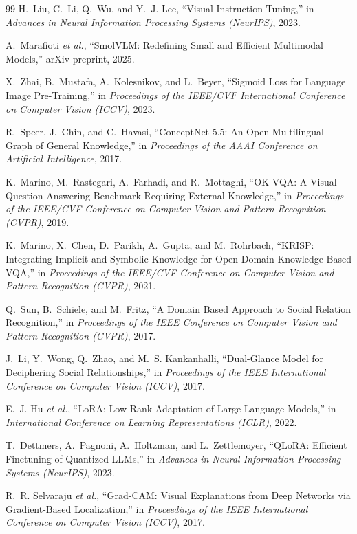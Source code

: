 \documentclass[12pt,a4paper,oneside]{report}
\begin{document}
\begin{thebibliography}{99}
H.~Liu, C.~Li, Q.~Wu, and Y.~J. Lee, ``Visual Instruction Tuning,'' in
\emph{Advances in Neural Information Processing Systems (NeurIPS)}, 2023.

A.~Marafioti \emph{et al.}, ``SmolVLM: Redefining Small and Efficient
Multimodal Models,'' arXiv preprint, 2025.

X.~Zhai, B.~Mustafa, A.~Kolesnikov, and L.~Beyer, ``Sigmoid Loss for Language
Image Pre-Training,'' in \emph{Proceedings of the IEEE/CVF International
Conference on Computer Vision (ICCV)}, 2023.

R.~Speer, J.~Chin, and C.~Havasi, ``ConceptNet 5.5: An Open Multilingual Graph
of General Knowledge,'' in \emph{Proceedings of the AAAI Conference on
Artificial Intelligence}, 2017.

K.~Marino, M.~Rastegari, A.~Farhadi, and R.~Mottaghi, ``OK-VQA: A Visual
Question Answering Benchmark Requiring External Knowledge,'' in
\emph{Proceedings of the IEEE/CVF Conference on Computer Vision and Pattern
Recognition (CVPR)}, 2019.

K.~Marino, X.~Chen, D.~Parikh, A.~Gupta, and M.~Rohrbach, ``KRISP: Integrating
Implicit and Symbolic Knowledge for Open-Domain Knowledge-Based VQA,'' in
\emph{Proceedings of the IEEE/CVF Conference on Computer Vision and Pattern
Recognition (CVPR)}, 2021.

Q.~Sun, B.~Schiele, and M.~Fritz, ``A Domain Based Approach to Social Relation
Recognition,'' in \emph{Proceedings of the IEEE Conference on Computer Vision
and Pattern Recognition (CVPR)}, 2017.

J.~Li, Y.~Wong, Q.~Zhao, and M.~S. Kankanhalli, ``Dual-Glance Model for
Deciphering Social Relationships,'' in \emph{Proceedings of the IEEE
International Conference on Computer Vision (ICCV)}, 2017.

E.~J. Hu \emph{et al.}, ``LoRA: Low-Rank Adaptation of Large Language Models,''
in \emph{International Conference on Learning Representations (ICLR)}, 2022.

T.~Dettmers, A.~Pagnoni, A.~Holtzman, and L.~Zettlemoyer, ``QLoRA: Efficient
Finetuning of Quantized LLMs,'' in \emph{Advances in Neural Information
Processing Systems (NeurIPS)}, 2023.

R.~R. Selvaraju \emph{et al.}, ``Grad-CAM: Visual Explanations from Deep
Networks via Gradient-Based Localization,'' in \emph{Proceedings of the IEEE
International Conference on Computer Vision (ICCV)}, 2017.


\end{thebibliography}
\end{document}
